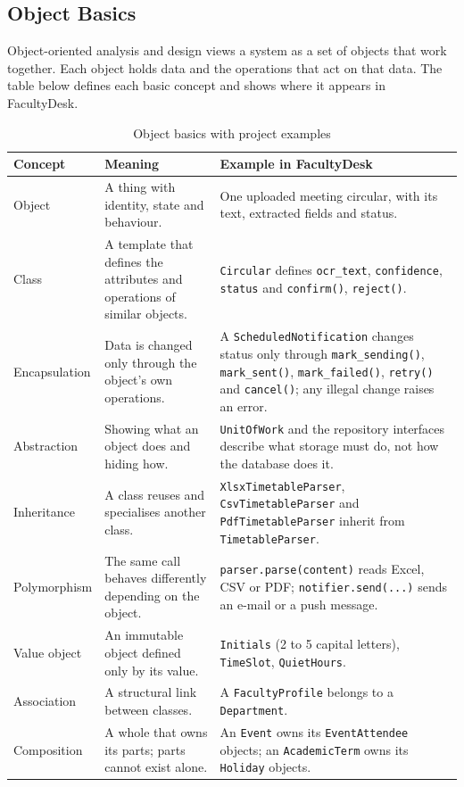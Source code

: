 
\subsection{Object Basics}
Object-oriented analysis and design views a system as a set of objects that work together. Each object holds data and the operations that act on that data. The table below defines each basic concept and shows where it appears in FacultyDesk.

{\small
{}
\begin{xltabular}{\textwidth}{|p{2.6cm}|Y|Y|}
\caption{Object basics with project examples}\\
\hline
\textbf{Concept} & \textbf{Meaning} & \textbf{Example in FacultyDesk} \\ \hline
Object & A thing with identity, state and behaviour. & One uploaded meeting circular, with its text, extracted fields and status. \\ \hline
Class & A template that defines the attributes and operations of similar objects. & \texttt{Circular} defines \texttt{ocr\_text}, \texttt{confidence}, \texttt{status} and \texttt{confirm()}, \texttt{reject()}. \\ \hline
Encapsulation & Data is changed only through the object's own operations. & A \texttt{ScheduledNotification} changes status only through \texttt{mark\_sending()}, \texttt{mark\_sent()}, \texttt{mark\_failed()}, \texttt{retry()} and \texttt{cancel()}; any illegal change raises an error. \\ \hline
Abstraction & Showing what an object does and hiding how. & \texttt{UnitOfWork} and the repository interfaces describe what storage must do, not how the database does it. \\ \hline
Inheritance & A class reuses and specialises another class. & \texttt{XlsxTimetableParser}, \texttt{CsvTimetableParser} and \texttt{PdfTimetableParser} inherit from \texttt{TimetableParser}. \\ \hline
Polymorphism & The same call behaves differently depending on the object. & \texttt{parser.parse(content)} reads Excel, CSV or PDF; \texttt{notifier.send(...)} sends an e-mail or a push message. \\ \hline
Value object & An immutable object defined only by its value. & \texttt{Initials} (2 to 5 capital letters), \texttt{TimeSlot}, \texttt{QuietHours}. \\ \hline
Association & A structural link between classes. & A \texttt{FacultyProfile} belongs to a \texttt{Department}. \\ \hline
Composition & A whole that owns its parts; parts cannot exist alone. & An \texttt{Event} owns its \texttt{EventAttendee} objects; an \texttt{AcademicTerm} owns its \texttt{Holiday} objects. \\ \hline
\end{xltabular}}

